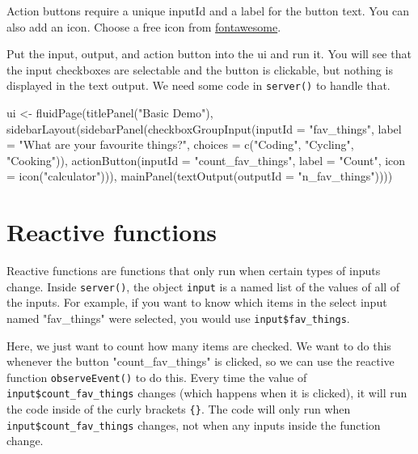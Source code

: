 \documentclass[
  oneside]{book}
\newenvironment{Shaded}{\begin{snugshade}}{\end{snugshade}}
\newcommand{\AttributeTok}[1]{\textcolor[rgb]{0.77,0.63,0.00}{#1}}
\newcommand{\FunctionTok}[1]{\textcolor[rgb]{0.00,0.00,0.00}{#1}}
\newcommand{\NormalTok}[1]{#1}
\newcommand{\OtherTok}[1]{\textcolor[rgb]{0.56,0.35,0.01}{#1}}
\newcommand{\StringTok}[1]{\textcolor[rgb]{0.31,0.60,0.02}{#1}}
\begin{document}
Action buttons require a unique \AttributeTok{inputId} and a \AttributeTok{label} for the button text. You can also add an \AttributeTok{icon}. Choose a free icon from \href{https://fontawesome.com/icons?d=gallery\&m=free}{fontawesome}.

Put the input, output, and action button into the ui and run it. You will see that the input checkboxes are selectable and the button is clickable, but nothing is displayed in the text output. We need some code in \texttt{server}\texttt{()} to handle that.

\begin{Shaded}
\begin{Highlighting}[]
\NormalTok{ui }\OtherTok{\textless{}{-}} \FunctionTok{fluidPage}\NormalTok{(}\FunctionTok{titlePanel}\NormalTok{(}\StringTok{"Basic Demo"}\NormalTok{), }\FunctionTok{sidebarLayout}\NormalTok{(}\FunctionTok{sidebarPanel}\NormalTok{(}\FunctionTok{checkboxGroupInput}\NormalTok{(}\AttributeTok{inputId =} \StringTok{"fav\_things"}\NormalTok{,}
    \AttributeTok{label =} \StringTok{"What are your favourite things?"}\NormalTok{, }\AttributeTok{choices =} \FunctionTok{c}\NormalTok{(}\StringTok{"Coding"}\NormalTok{, }\StringTok{"Cycling"}\NormalTok{, }\StringTok{"Cooking"}\NormalTok{)),}
    \FunctionTok{actionButton}\NormalTok{(}\AttributeTok{inputId =} \StringTok{"count\_fav\_things"}\NormalTok{, }\AttributeTok{label =} \StringTok{"Count"}\NormalTok{, }\AttributeTok{icon =} \FunctionTok{icon}\NormalTok{(}\StringTok{"calculator"}\NormalTok{))),}
    \FunctionTok{mainPanel}\NormalTok{(}\FunctionTok{textOutput}\NormalTok{(}\AttributeTok{outputId =} \StringTok{"n\_fav\_things"}\NormalTok{))))}
\end{Highlighting}
\end{Shaded}

\hypertarget{first-reactive}{%
\section{Reactive functions}\label{first-reactive}}

Reactive functions are functions that only run when certain types of inputs change. Inside \texttt{server}\texttt{()}, the object \texttt{input} is a named list of the values of all of the inputs. For example, if you want to know which items in the select input named \StringTok{"fav\_things"} were selected, you would use \texttt{input\$fav\_things}.

Here, we just want to count how many items are checked. We want to do this whenever the button \StringTok{"count\_fav\_things"} is clicked, so we can use the reactive function \texttt{observeEvent}\texttt{()} to do this. Every time the value of \texttt{input\$count\_fav\_things} changes (which happens when it is clicked), it will run the code inside of the curly brackets \texttt{\{\}}. The code will only run when \texttt{input\$count\_fav\_things} changes, not when any inputs inside the function change.
\end{document}
